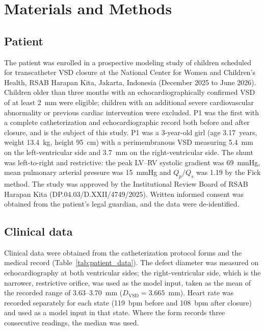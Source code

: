 \section{Materials and Methods}

\subsection{Patient}
\label{sec:study_population}
The patient was enrolled in a prospective modeling study of children scheduled for transcatheter VSD closure at the National Center for Women and Children's Health, RSAB Harapan Kita, Jakarta, Indonesia (December 2025 to June 2026). Children older than three months with an echocardiographically confirmed VSD of at least 2~mm were eligible; children with an additional severe cardiovascular abnormality or previous cardiac intervention were excluded. P1 was the first with a complete catheterization and echocardiographic record both before and after closure, and is the subject of this study. P1 was a 3-year-old girl (age 3.17~years, weight 13.4~kg, height 95~cm) with a perimembranous VSD measuring 5.4~mm on the left-ventricular side and 3.7~mm on the right-ventricular side. The shunt was left-to-right and restrictive: the peak LV--RV systolic gradient was 69~mmHg, mean pulmonary arterial pressure was 15~mmHg and $Q_p/Q_s$ was 1.19 by the Fick method. The study was approved by the Institutional Review Board of RSAB Harapan Kita (DP.04.03/D.XXII/4749/2025). Written informed consent was obtained from the patient's legal guardian, and the data were de-identified.

\subsection{Clinical data}
\label{sec:data}
Clinical data were obtained from the catheterization protocol forms and the medical record (Table~\ref{tab:patient_data}). The defect diameter was measured on echocardiography at both ventricular sides; the right-ventricular side, which is the narrower, restrictive orifice, was used as the model input, taken as the mean of the recorded range of 3.63--3.70~mm ($D_{\mathrm{VSD}} = 3.665$~mm). Heart rate was recorded separately for each state (119~bpm before and 108~bpm after closure) and used as a model input in that state. Where the form records three consecutive readings, the median was used.

